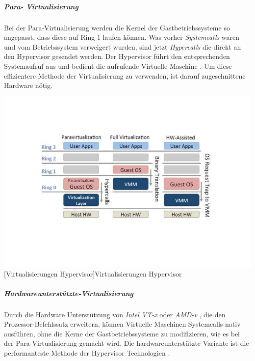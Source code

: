  \subparagraph{Para- Virtualisierung}
 Bei der Para-Virtualisierung werden die Kernel der Gastbetriebssysteme so angepasst, dass diese auf Ring 1 laufen können. Was vorher \emph{Systemcalls} waren und vom Betriebssystem verweigert wurden, sind jetzt \emph{Hypercalls} die direkt an den Hypervisor gesendet werden. Der Hypervisor führt den entsprechenden Systemaufruf aus und bedient die aufrufende Virtuelle Maschine \cite{Meinel2011VirtualisierungMarktubersicht}. Um diese effizientere Methode der Virtualisierung zu verwenden, ist darauf zugeschnittene Hardware nötig.

\vspace{1em}
\begin{minipage}{\linewidth}
	\centering
	\includegraphics[width=1\linewidth]{pics/02Virtualisierungen_Hypervisor.PNG}
	[Virtualisierungen Hypervisor]{Virtualisierungen Hypervisor \cite{Fayyad-Kazan2013BenchmarkingHypervisors}}
	\label{fig:Virtualisierungen_Hypervisor}
\end{minipage}
 
\subparagraph{Hardwareunterstützte-Virtualisierung}
Durch die Hardware Unterstützung von \emph{Intel VT-x} \cite{TechnologyIntel} oder \emph{AMD-v} \cite{AMDVirtualisierungstechnologie}, die den Prozessor-Befehlssatz erweitern, können Virtuelle Maschinen Systemcalls nativ ausführen, ohne die Kerne der Gastbetriebssysteme zu modifizieren, wie es bei der Para-Virtualisierung gemacht wird. Die hardwareunterstützte Variante ist die performanteste Methode der Hypervisor Technologien \cite{Meinel2011VirtualisierungMarktubersicht}.





